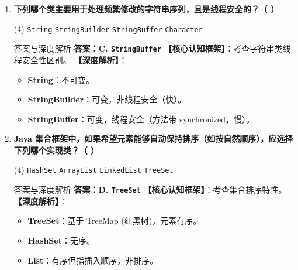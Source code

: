 ﻿\documentclass[12pt, a4paper]{ctexart}
\newcommand{\code}[1]{\texttt{#1}}
\begin{document}
\begin{enumerate}[label=\textbf{\arabic*.}, leftmargin=*, itemsep=1.5em]
	\item \textbf{下列哪个类主要用于处理频繁修改的字符串序列，且是线程安全的？（ \quad ）}
	      \begin{tasks}(4)
		      \task \code{String} \task \code{StringBuilder} \task \code{StringBuffer} \task \code{Character}
	      \end{tasks}
	      \begin{bluebox}{答案与深度解析}
		      \textbf{答案：C. \code{StringBuffer}}
		      \textbf{【核心认知框架】}：考查字符串类线程安全性区别。
		      \textbf{【深度解析】}：
		      \begin{itemize}[leftmargin=*, nosep]
			      \item \textbf{String}：不可变。
			      \item \textbf{StringBuilder}：可变，非线程安全（快）。
			      \item \textbf{StringBuffer}：可变，线程安全（方法带 synchronized，慢）。
		      \end{itemize}
	      \end{bluebox}

	\item \textbf{Java 集合框架中，如果希望元素能够自动保持排序（如按自然顺序），应选择下列哪个实现类？（ \quad ）}
	      \begin{tasks}(4)
		      \task \code{HashSet} \task \code{ArrayList} \task \code{LinkedList} \task \code{TreeSet}
	      \end{tasks}
	      \begin{bluebox}{答案与深度解析}
		      \textbf{答案：D. \code{TreeSet}}
		      \textbf{【核心认知框架】}：考查集合排序特性。
		      \textbf{【深度解析】}：
		      \begin{itemize}[leftmargin=*, nosep]
			      \item \textbf{TreeSet}：基于 TreeMap (红黑树)，元素有序。
			      \item \textbf{HashSet}：无序。
			      \item \textbf{List}：有序但指插入顺序，非排序。
		      \end{itemize}
	      \end{bluebox}


\end{enumerate}
\end{document}

